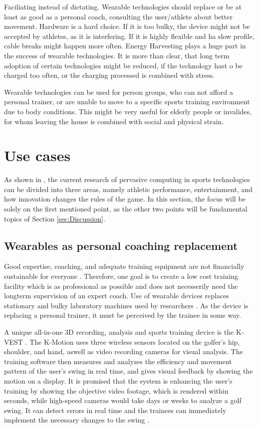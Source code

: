 \documentclass[sigconf]{acmart}
\begin{document}
			
			
		Faciliating instead of dictating. Wearable technologies should replace or be at least as good as a personal coach, consulting the user/athlete about better movement.
		Hardware is a hard choice. If it is too bulky, the device might not be accepted by athletes, as it is interfering. If it is highly flexible and ha slow profile, cable breaks might happen more often.
		Energy Harvesting plays a huge part in the success of wearable technologies. It is more than clear, that long term adoption of certain technologies might be reduced, if the technology hast o be charged too often, or the charging processed is combined with stress.
		
		Wearable technologies can be used for person groups, who can not afford a personal trainer, or are unable to move to a specific sports training environment due to body conditions. This might be very useful for elderly people or invalides, for whom leaving the house is combined with social and physical strain.


	\section{Use cases} 
		As shown in \cite{PervasiveComputing}, the current research of pervasive computing in sports technologies can be divided into three areas, namely athletic performance, entertainment, and how innovation changes the rules of the game. In this section, the focus will be solely on the first mentioned point, as the other two points will be fundamental topics of Section \ref{sec:Discussion}.
		
		\subsection{Wearables as personal coaching replacement}
		Good expertise, coaching, and adequate training equipment are not financially sustainable for everyone \cite{PersonalTrainer}.
		Therefore, one goal is to create a low cost training facility which is as professional as possible and does not necesserily need the longterm supervision of an expert coach. Use of wearable devices replaces stationary and bulky laboratory machines used by researchers \cite{SportSensing}. As the device is replacing a personal trainer, it must be perceived by the trainee in some way.
		
		\par A unique all-in-one 3D recording, analysis and sports training device is the K-VEST \cite{KVEST}. The K-Motion uses three wireless sensors located on the golfer’s hip, shoulder, and hand, aswell as video recording cameras for visual analysis. The training software then measures and analyzes the efficiency and movement pattern of the user's swing in real time, and gives visual feedback by showing the motion on a display. It is promised that the system is enhancing the user's training by showing the objective video footage, which is rendered within seconds, while high-speed cameras would take days or weeks to analyze a golf swing. It can detect errors in real time and the trainees can immediately implement the necessary changes to the swing \cite{KVEST2}.
		
\end{document}

